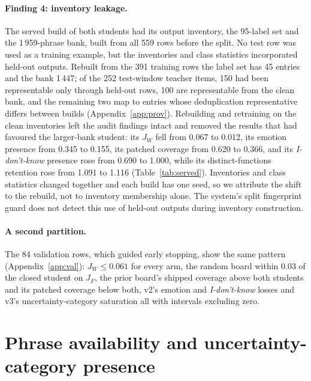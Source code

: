 \paragraph{Finding 4: inventory leakage.}
The served build of both students had its output inventory, the 95-label
set and the 1\,959-phrase bank, built from all 559 rows before the split.
No test row was used as a training example, but the inventories and class
statistics incorporated held-out outputs. Rebuilt from the 391 training
rows the label set has 45 entries and the bank 1\,447; of the 252
test-window teacher items, 150 had been representable only through
held-out rows, 100 are representable from the clean bank, and the
remaining two map to entries whose deduplication representative differs
between builds (Appendix~\ref{app:prov}). Rebuilding and retraining on
the clean inventories left the audit findings intact and removed the
results that had favoured the larger-bank student: its $J_W$ fell from
0.067 to 0.012, its emotion presence from 0.345 to 0.155, its patched
coverage from 0.620 to 0.366, and its \emph{I-don't-know} presence rose
from 0.690 to 1.000, while its distinct-functions retention rose from
1.091 to 1.116 (Table~\ref{tab:served}). Inventories and class statistics
changed together and each build has one seed, so we attribute the shift
to the rebuild, not to inventory membership alone. The system's split
fingerprint guard does not detect this use of held-out outputs during
inventory construction.

\paragraph{A second partition.}
The 84 validation rows, which guided early stopping, show the same
pattern (Appendix~\ref{app:val}): $J_W \le 0.061$ for every arm, the
random board within 0.03 of the closed student on $J_F$, the prior board's
shipped coverage above both students and its patched coverage below both,
v2's emotion and \emph{I-don't-know} losses and v3's uncertainty-category
saturation all with intervals excluding zero.

\section{Phrase availability and uncertainty-category presence}
\label{sec:causes}

